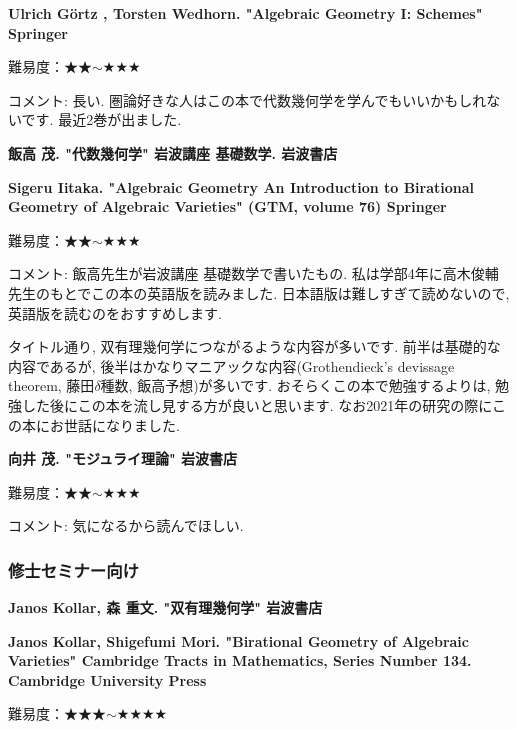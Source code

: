 \textbf{Ulrich G\"ortz , Torsten Wedhorn. "Algebraic Geometry I: Schemes" Springer}

難易度：★★$\sim$★★★  \vspace{-6pt}

コメント: 長い. 圏論好きな人はこの本で代数幾何学を学んでもいいかもしれないです. 最近2巻が出ました. 
\vspace{8pt}

\textbf{飯高 茂. "代数幾何学" 岩波講座 基礎数学. 岩波書店} \vspace{-6pt}

\textbf{Sigeru Iitaka. "Algebraic Geometry
An Introduction to Birational Geometry of Algebraic Varieties"  (GTM, volume 76) Springer} \vspace{-6pt}

難易度：★★$\sim$★★★  \vspace{-6pt} 

コメント: 飯高先生が岩波講座 基礎数学で書いたもの. 私は学部4年に高木俊輔先生のもとでこの本の英語版を読みました. 日本語版は難しすぎて読めないので, 英語版を読むのをおすすめします.

タイトル通り, 双有理幾何学につながるような内容が多いです. %
前半は基礎的な内容であるが, 後半はかなりマニアックな内容(Grothendieck's devissage theorem, 藤田$\delta$種数, 飯高予想)が多いです. おそらくこの本で勉強するよりは, 勉強した後にこの本を流し見する方が良いと思います. なお2021年の研究の際にこの本にお世話になりました.
\vspace{8pt}

\textbf{向井 茂. "モジュライ理論" 岩波書店}

難易度：★★$\sim$★★★  \vspace{-6pt}

コメント: 気になるから読んでほしい. 

\subsubsection{修士セミナー向け}

\textbf{Janos Kollar, 森 重文. "双有理幾何学" 岩波書店} \vspace{-6pt}

\textbf{Janos Kollar, Shigefumi Mori. "Birational Geometry of Algebraic Varieties" Cambridge Tracts in Mathematics, Series Number 134. Cambridge University Press} \vspace{-6pt}

難易度：★★★$\sim$★★★★\vspace{-6pt} 

